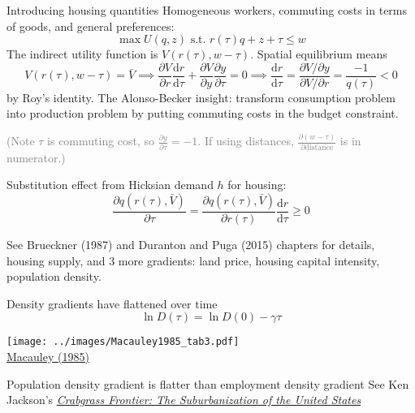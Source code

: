 \documentclass[11pt,notes=hide,aspectratio=169]{beamer}
\begin{document}
\begin{frame}{Introducing housing quantities}
Homogeneous workers, commuting costs in terms of goods, and general preferences:
$$
\max U(q,z) \text{ s.t. } r(\tau) q + z + \tau \leq w 
$$
The indirect utility function is $V(r(\tau),w - \tau)$.
Spatial equilibrium means
$$
V(r(\tau),w - \tau) = \bar{V}
\implies
\frac{\partial V}{\partial r}\frac{\textrm{d} r}{\textrm{d} \tau} 
+
\frac{\partial V}{\partial y}\frac{\partial y}{\partial \tau}
=
0
\implies
\frac{\textrm{d} r}{\textrm{d} \tau}
=
\frac{\partial V/\partial y}{\partial V/\partial r}
=
\frac{-1}{q(\tau)}
< 0
$$
by Roy's identity.
The Alonso-Becker insight: transform consumption problem into production problem by putting commuting costs in the budget constraint.
{\footnotesize 
\textcolor{gray}{(Note $\tau$ is commuting cost, so $\frac{\partial y}{\partial \tau} = -1$. If using distances, $\frac{\partial (w-\tau)}{\partial \text{distance}}$ is in numerator.)}
\par}
Substitution effect from Hicksian demand $h$ for housing:
$$
\frac{\partial q(r(\tau),\bar{V})}{\partial \tau}
=
\frac{\partial q(r(\tau),\bar{V})}{\partial r(\tau)}
\frac{\textrm{d} r}{\textrm{d} \tau}
\geq 0
$$
{\small 
See Brueckner (1987) and Duranton and Puga (2015) chapters for details,
housing supply, and 3 more gradients:
land price, housing capital intensity, population density.
\par}
\end{frame}
\begin{frame}{Density gradients have flattened over time}
\vspace{-4mm}
$$\ln D (\tau) = \ln D(0) - \gamma \tau$$
\begin{center}
\texttt{[image: ../images/Macauley1985\_tab3.pdf]}\\ \vspace{-2mm}
\href{https://doi.org/10.1016/0094-1190(85)90021-X}{Macauley (1985)}
\end{center}
Population density gradient is flatter than employment density gradient
See Ken Jackson's \href{https://en.wikipedia.org/wiki/Crabgrass_Frontier}{\textit{Crabgrass Frontier: The Suburbanization of the United States}}
\end{frame}
\end{document}

